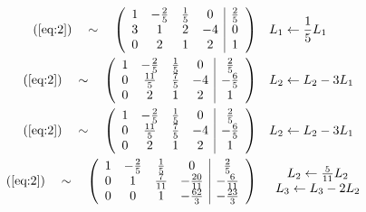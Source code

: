 \documentclass[
    11pt,
    a4paper,
    oneside,
    headinlcude, footinclude,
    twoside,
]{report}
\begin{document}
\[
    \begin{split}
        (\ref{eq:2}) \quad \sim \quad 
        \left(\begin{array}{cccc|c}
             1 & -\frac{2}{5} & \frac{1}{5} & 0 & \frac{2}{5}\\
             3 & 1 & 2 & -4 & 0\\
             0 & 2 & 1 & 2 & 1\\
        \end{array}\right) 
        &\quad L_{1} \leftarrow \frac{1}{5} L_{1}\\
        (\ref{eq:2}) \quad \sim \quad 
        \left(\begin{array}{cccc|c}
             1 & -\frac{2}{5} & \frac{1}{5} & 0 & \frac{2}{5}\\
             0 & \frac{11}{5} & \frac{7}{5} & -4 & -\frac{6}{5}\\
             0 & 2 & 1 & 2 & 1\\
        \end{array}\right) 
        &\quad L_{2} \leftarrow L_{2} - 3 L_{1}\\
        (\ref{eq:2}) \quad \sim \quad 
        \left(\begin{array}{cccc|c}
             1 & -\frac{2}{5} & \frac{1}{5} & 0 & \frac{2}{5}\\
             0 & \frac{11}{5} & \frac{7}{5} & -4 & -\frac{6}{5}\\
             0 & 2 & 1 & 2 & 1\\
        \end{array}\right) 
        &\quad L_{2} \leftarrow L_{2} - 3 L_{1}\\
        (\ref{eq:2}) \quad \sim \quad 
        \left(\begin{array}{cccc|c}
             1 & -\frac{2}{5} & \frac{1}{5} & 0 & \frac{2}{5}\\
             0 & 1 & \frac{7}{11} & - \frac{20}{11} & -\frac{6}{11}\\
             0 & 0 & 1 & - \frac{62}{3} & - \frac{23}{3}\\
         \end{array}\right) 
         &\quad \begin{array}{c} L_{2} \leftarrow \frac{5}{11} L_{2} \\ L_{3}
         \leftarrow L_{3} - 2 L_{2}\end{array}\\
    \end{split}
\]
\end{document}

